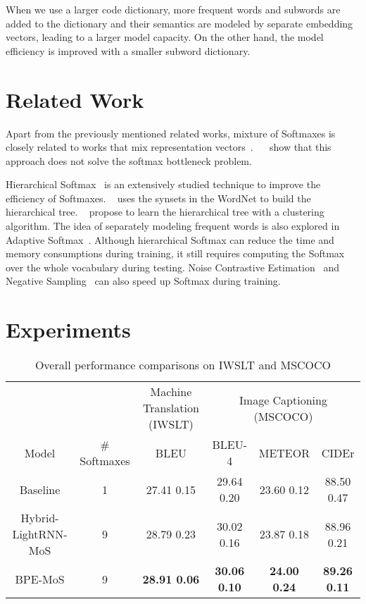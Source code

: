 \documentclass[letterpaper]{article} \usepackage{aaai19}  \usepackage{times}  \usepackage{helvet}  \usepackage{courier}  \usepackage{url}  \usepackage{graphicx}  \frenchspacing  \usepackage{booktabs}
\begin{document}
When we use a larger code dictionary, more frequent words and subwords are added to the dictionary and their semantics are modeled by separate embedding vectors, leading to a larger model capacity. On the other hand, the model efficiency is improved with a smaller subword dictionary.



\section{Related Work}
Apart from the previously mentioned related works, mixture of Softmaxes is closely related to works that mix  representation vectors~\cite{eigen2013learning,shazeer2017outrageously}. ~\citeauthor{yang2017breaking}~ show that this approach does not solve the softmax bottleneck problem.

Hierarchical Softmax~\cite{morin2005hierarchical} is an extensively studied technique to improve the efficiency of Softmaxes. 
\citeauthor{morin2005hierarchical}~ uses the synsets in the WordNet to build the hierarchical tree. 
\citeauthor{mnih2009scalable}~ propose to learn the hierarchical tree with a clustering algorithm. The idea of separately modeling frequent words is also explored in Adaptive Softmax~\cite{grave2016efficient}.
Although hierarchical Softmax can reduce the time and memory consumptions during training, it still requires computing the Softmax over the whole vocabulary during testing. 
Noise Contrastive Estimation~\cite{gutmann2012noise,mnih2012fast} and Negative Sampling~\cite{mikolov2013distributed} can also speed up Softmax during training.

\section{Experiments}

\begin{table*}
\centering


\small
\begin{tabular}{c|c|c|ccc} 
\toprule
& & Machine Translation (IWSLT) & \multicolumn{3}{c}{Image Captioning (MSCOCO)}  \\
Model &\# Softmaxes & BLEU & BLEU-4 & METEOR & CIDEr \\
\midrule
Baseline & 1& 27.41  0.15 & 29.64  0.20 & 23.60  0.12 & 88.50  0.47  \\ 
Hybrid-LightRNN-MoS & 9&28.79  0.23 & 30.02  0.16 & 23.87  0.18 & 88.96  0.21 \\
BPE-MoS & 9& \textbf{28.91  0.06} &\textbf{30.06  0.10} & \textbf{24.00  0.24}  & \textbf{89.26  0.11} \\
\bottomrule
\end{tabular}
\caption{Overall performance comparisons on IWSLT and MSCOCO}
\label{tab:overall}
\end{table*}
\end{document}
